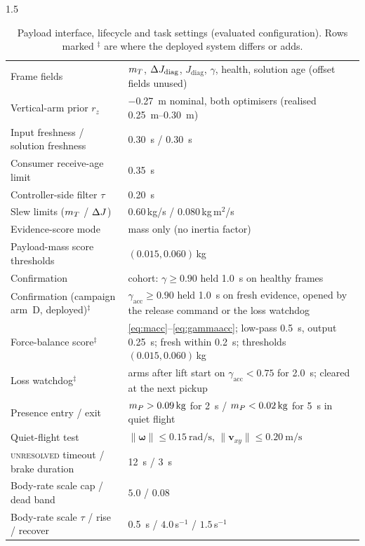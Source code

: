 \begin{appendices}
\begin{spacing}{1.5}
\begin{table}[ht]
\centering
\caption{Payload interface, lifecycle and task settings (evaluated configuration). Rows marked $^{\ddagger}$ are where the deployed system differs or adds.}
\small
\begin{tabularx}{\textwidth}{@{}p{} X@{}}
\toprule
Frame fields & $m_T$, $\Delta J_{\mathrm{diag}}$, $J_{\mathrm{diag}}$, $\gamma$, health, solution age (offset fields unused) \\
Vertical-arm prior $r_z$ & \SI{-0.27}{\meter} nominal, both optimisers (realised \SIrange{0.25}{0.30}{\meter}) \\
Input freshness / solution freshness & \SI{0.30}{\second} / \SI{0.30}{\second} \\
Consumer receive-age limit & \SI{0.35}{\second} \\
Controller-side filter $\tau$ & \SI{0.20}{\second} \\
Slew limits ($m_T$ / $\Delta J$) & $0.60$\,kg/s / $0.080$\,kg\,m$^2$/s \\
Evidence-score mode & mass only (no inertia factor) \\
Payload-mass score thresholds & $(0.015,0.060)$\,kg \\
Confirmation & cohort: $\gamma\ge0.90$ held \SI{1.0}{\second} on healthy frames \\
Confirmation (campaign arm~D, deployed)$^{\ddagger}$ & $\gamma_{\mathrm{acc}}\ge0.90$ held \SI{1.0}{\second} on fresh evidence, opened by the release command or the loss watchdog \\
Force-balance score$^{\ddagger}$ & \eqref{eq:macc}--\eqref{eq:gammaacc}; low-pass \SI{0.5}{\second}, output \SI{0.25}{\second}; fresh within \SI{0.2}{\second}; thresholds $(0.015,0.060)$\,kg \\
Loss watchdog$^{\ddagger}$ & arms after lift start on $\gamma_{\mathrm{acc}}<0.75$ for \SI{2.0}{\second}; cleared at the next pickup \\
Presence entry / exit & $\mP>\SI{0.09}{\kg}$ for \SI{2}{\second} / $\mP<\SI{0.02}{\kg}$ for \SI{5}{\second} in quiet flight \\
Quiet-flight test & $\lVert\bm\omega\rVert\le\SI{0.15}{\radian\per\second}$, $\lVert\bm v_{xy}\rVert\le\SI{0.20}{\meter\per\second}$ \\
\textsc{unresolved} timeout / brake duration & \SI{12}{\second} / \SI{3}{\second} \\
Body-rate scale cap / dead band & $5.0$ / $0.08$ \\
Body-rate scale $\tau$ / rise / recover & \SI{0.5}{\second} / $4.0$\,s$^{-1}$ / $1.5$\,s$^{-1}$ \\

\end{tabularx}
\end{table}
\end{spacing}
\end{appendices}
